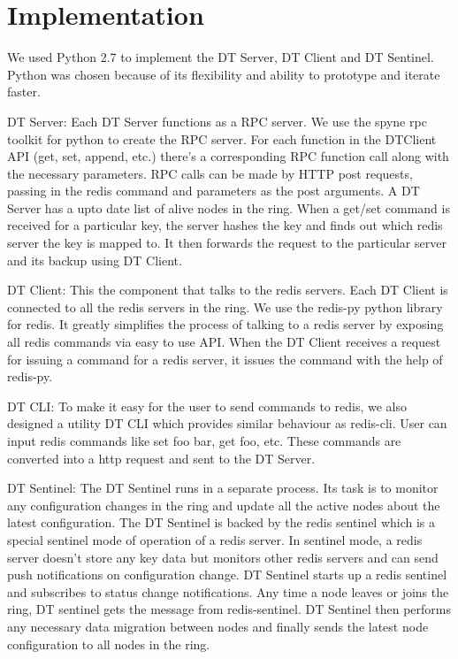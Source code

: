 \documentclass[10pt,twocolumn,letterpaper]{article}
\begin{document}
\section{Implementation} \label{implementation}


We used Python 2.7 to implement the DT Server, DT Client and DT Sentinel. Python was chosen because of its flexibility and ability to prototype and iterate faster. 

DT Server: Each DT Server functions as a RPC server. We use the spyne rpc toolkit for python to create the RPC server. For each function in the DTClient API (get, set, append, etc.) there's a corresponding RPC function call along with the necessary parameters. RPC calls can be made by HTTP post requests, passing in the redis command and parameters as the post arguments. A DT Server has a upto date list of alive nodes in the ring. When a get/set command is received for a particular key, the server hashes the key and finds out which redis server the key is mapped to. It then forwards the request to the particular server and its backup using DT Client.

DT Client: This the component that talks to the redis servers. Each DT Client is connected to all the redis servers in the ring. We use the redis-py python library for redis. It greatly simplifies the process of talking to a redis server by exposing all redis commands via easy to use API. When the DT Client receives a request for issuing a command for a redis server, it issues the command with the help of redis-py.

DT CLI: To make it easy for the user to send commands to redis, we also designed a utility DT CLI which provides similar behaviour as redis-cli. User can input redis commands like set foo bar, get foo, etc. These commands are converted into a http request and sent to the DT Server. 

DT Sentinel: The DT Sentinel runs in a separate process. Its task is to monitor any configuration changes in the ring and update all the active nodes about the latest configuration. The DT Sentinel is backed by the redis sentinel which is a special sentinel mode of operation of a redis server. In sentinel mode, a redis server doesn't store any key data but monitors other redis servers and can send push notifications on configuration change. DT Sentinel starts up a redis sentinel and subscribes to status change notifications. Any time a node leaves or joins the ring, DT sentinel gets the message from redis-sentinel. DT Sentinel then performs any necessary data migration between nodes and finally sends the latest node configuration to all nodes in the ring.
\end{document}
